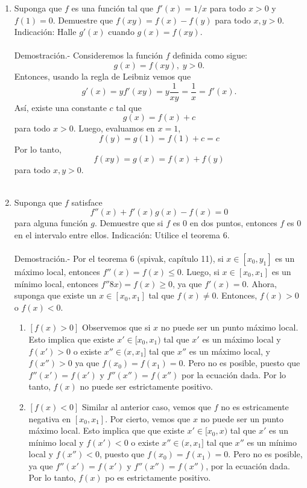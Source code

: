 \begin{enumerate}[\bfseries 1.]
\begin{enumerate}[(a)]
	\end{enumerate}

    \item Suponga que $f$ es una función tal que $f'(x)=1/x$ para todo $x>0$ y $f(1)=0$. Demuestre que $f(xy)=f(x)-f(y)$ para todo $x,y>0$. Indicación: Halle $g'(x)$ cuando $g(x)=f(xy)$.\\\\
	Demostración.-\; Consideremos la función $f$ definida como sigue:
	$$g(x)=f(xy),\; y>0.$$
	Entonces, usando la regla de Leibniz vemos que
	$$g'(x)=yf'(xy)=y\dfrac{1}{xy}=\dfrac{1}{x}=f'(x).$$
	Así, existe una constante $c$ tal que
	$$g(x)=f(x)+c$$
	para todo $x>0.$ Luego, evaluamos en $x=1$,
	$$f(y)=g(1)=f(1)+c=c$$ 
	Por lo tanto,
	$$f(xy)=g(x)=f(x)+f(y)$$
	para todo $x,y>0$.\\\\

    \item Suponga que $f$ satisface
    $$f''(x)+f'(x)g(x)-f(x)=0$$
    para alguna función $g$. Demuestre que si $f$ es $0$ en dos puntos, entonces $f$ es $0$ en el intervalo entre ellos. Indicación: Utilice el teorema 6.\\\\
    Demostración.-\; Por el teorema 6 (spivak, capítulo 11), si $x\in [x_0,y_1]$ es un máximo local, entonces $f''(x)=f(x)\leq 0$. Luego, si $x\in [x_0,x_1]$ es un mínimo local, entonces $f''8x)=f(x)\geq 0$, ya que $f'(x)=0.$ Ahora, suponga que existe un $x\in [x_0,x_1]$ tal que $f(x)\neq 0$. Entonces, $f(x)>0$ o $f(x)<0$.

    \begin{enumerate}

	\item $[f(x)>0]$ Observemos que si $x$ no puede ser un punto máximo local. Esto implica que existe $x'\in [x_0,x_1)$ tal que $x'$ es un máximo local y $f(x')>0$ o existe $x''\in(x,x_1]$ tal que $x''$ es un máximo local, y $f(x'')>0$ ya que $f(x_0)=f(x_1)=0.$ Pero no es posible, puesto que $f''(x')=f(x')$ y $f''(x'')=f(x'')$ por la ecuación dada. Por lo tanto, $f(x)$ no puede ser estrictamente positivo.

	\item $[f(x)<0]$ Similar al anterior caso, vemos que $f$ no es estricamente negativa en $[x_0,x_1]$. Por cierto, vemos que $x$ no puede ser un punto máximo local. Esto implica que que existe $x'\in[x_0,x)$ tal que $x'$ es un mínimo local y $f(x')<0$ o existe $x''\in (x,x_1]$ tal que $x''$ es un mínimo local y $f(x'')<0$, puesto que $f(x_0)=f(x_1)=0.$ Pero no es posible, ya que $f''(x')=f(x')$ y $f''(x'')=f(x'')$, por la ecuación dada. Por lo tanto, $f(x)$ po es estrictamente positivo.
 

\end{enumerate}
\end{enumerate}
